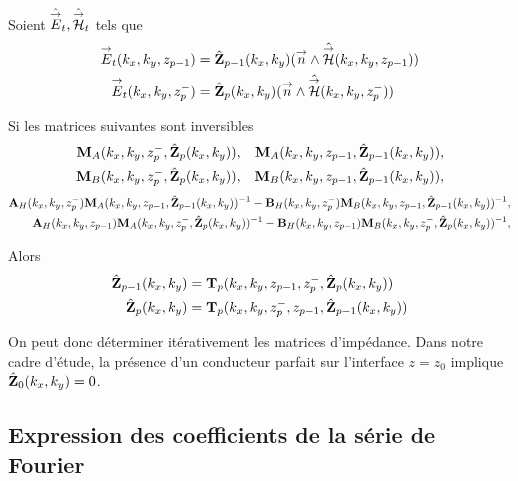    \begin{prop}%
      \label{prop:plan:synthese:impedance}{}~

      Soient \(\hat{{\overset{\rightarrow}{E}}}_t,\hat{{\overset{\rightarrow}{\mathcal{H}}}}_t\) tels que 
      \begin{align*}
      {\overset{\rightarrow}{E}}_t(k_x,k_y,z_{p-1}) &= \hat{\mathbf{Z}}_{p-1}(k_x,k_y)({\overset{\rightarrow}{n}} \wedge \hat{{\overset{\rightarrow}{\mathcal{H}}}}(k_x,k_y,z_{p-1}))
      \\
      {\overset{\rightarrow}{E}}_t(k_x,k_y,z_p^-) &= \hat{\mathbf{Z}}_{p}(k_x,k_y)({\overset{\rightarrow}{n}} \wedge \hat{{\overset{\rightarrow}{\mathcal{H}}}}(k_x,k_y,z_p^-))
      \end{align*}

      Si les matrices suivantes sont inversibles
      \begin{align*}
        \mathbf{M}_{A}(k_x,k_y,z_p^-,\hat{\mathbf{Z}}_{p}(k_x,k_y)), && \mathbf{M}_{A}(k_x,k_y,z_{p-1},\hat{\mathbf{Z}}_{p-1}(k_x,k_y)),
        \\
        \mathbf{M}_{B}(k_x,k_y,z_p^-,\hat{\mathbf{Z}}_{p}(k_x,k_y)), && \mathbf{M}_{B}(k_x,k_y,z_{p-1},\hat{\mathbf{Z}}_{p-1}(k_x,k_y)),
      \end{align*}
      \begin{align*}
        \mathbf{A}_{H}(k_x,k_y,z_p^-)\mathbf{M}_{A}(k_x,k_y,z_{p-1},\hat{\mathbf{Z}}_{p-1}(k_x,k_y))^{-1} - \mathbf{B}_{H}(k_x,k_y,z_p^-)\mathbf{M}_{B}(k_x,k_y,z_{p-1},\hat{\mathbf{Z}}_{p-1}(k_x,k_y))^{-1},
        \\
        \mathbf{A}_{H}(k_x,k_y,z_{p-1})\mathbf{M}_{A}(k_x,k_y,z_p^-,\hat{\mathbf{Z}}_{p}(k_x,k_y))^{-1} - \mathbf{B}_{H}(k_x,k_y,z_{p-1})\mathbf{M}_{B}(k_x,k_y,z_p^-,\hat{\mathbf{Z}}_{p}(k_x,k_y))^{-1},
      \end{align*}

      Alors 
      \begin{align*}
        \hat{\mathbf{Z}}_{p-1}(k_x,k_y) &= \mathbf{T}_p(k_x,k_y,z_{p-1},z_p^-,\hat{\mathbf{Z}}_{p}(k_x,k_y))
        \\
        \hat{\mathbf{Z}}_{p}(k_x,k_y) &= \mathbf{T}_p(k_x,k_y,z_p^-,z_{p-1},\hat{\mathbf{Z}}_{p-1}(k_x,k_y))
      \end{align*}

    \end{prop}

    On peut donc déterminer itérativement les matrices d'impédance. Dans notre cadre d'étude, la présence d'un conducteur parfait sur l'interface \(z= z_0\) implique \(\hat{\mathbf{Z}}_{0}(k_x,k_y) = 0\).


\subsection{Expression des coefficients de la série de Fourier}

